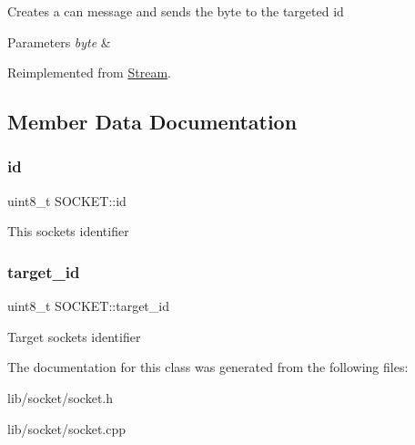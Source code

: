 Creates a can message and sends the byte to the targeted id 
\begin{DoxyParams}{Parameters}
{\em byte} & \\
\hline
\end{DoxyParams}


Reimplemented from \hyperlink{class_stream_aeaed767b3a8d946c6f81465fa83ff17f}{Stream}.



\subsection{Member Data Documentation}
\hypertarget{class_s_o_c_k_e_t_a0755fe74751c2d94d3d1679cad9e6544}{}\label{class_s_o_c_k_e_t_a0755fe74751c2d94d3d1679cad9e6544} 
\subsubsection{\texorpdfstring{id}{id}}
{\footnotesize\ttfamily uint8\+\_\+t S\+O\+C\+K\+E\+T\+::id\hspace{0.3cm}{\ttfamily [private]}}

This sockets identifier \hypertarget{class_s_o_c_k_e_t_a566ef7ae1ca5366f622bbe805954a031}{}\label{class_s_o_c_k_e_t_a566ef7ae1ca5366f622bbe805954a031} 
\subsubsection{\texorpdfstring{target\+\_\+id}{target\_id}}
{\footnotesize\ttfamily uint8\+\_\+t S\+O\+C\+K\+E\+T\+::target\+\_\+id\hspace{0.3cm}{\ttfamily [private]}}

Target sockets identifier 

The documentation for this class was generated from the following files\+:\begin{DoxyCompactItemize}
\item 
lib/socket/socket.\+h\item 
lib/socket/socket.\+cpp\end{DoxyCompactItemize}
